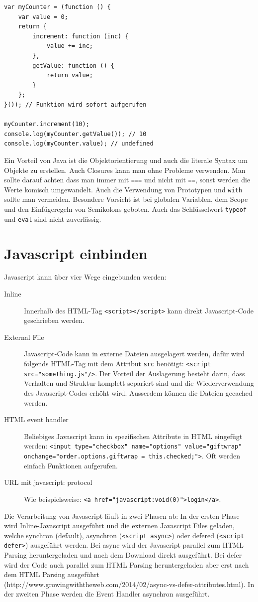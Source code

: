 \begin{lstlisting}[label=lst:scope,caption=Scope]
var myCounter = (function () {
	var value = 0;
	return {
		increment: function (inc) {
			value += inc;
		},
		getValue: function () {
			return value;
		}
	};
}()); // Funktion wird sofort aufgerufen

myCounter.increment(10);
console.log(myCounter.getValue()); // 10
console.log(myCounter.value); // undefined
\end{lstlisting}

Ein Vorteil von Java ist die Objektorientierung und auch die literale Syntax um Objekte zu erstellen. Auch Closures kann man ohne Probleme verwenden. Man sollte darauf achten dass man immer mit \lstinline|===| und nicht mit \lstinline|==|, sonst werden die Werte komisch umgewandelt. Auch die Verwendung von Prototypen und \lstinline|with| sollte man vermeiden. Besondere Vorsicht ist bei globalen Variablen, dem Scope und den Einfügeregeln von Semikolons geboten. Auch das Schlüsselwort \lstinline|typeof| und \lstinline|eval| sind nicht zuverlässig.

\section{Javascript einbinden}
Javascript kann über vier Wege eingebunden werden:
\begin{description}
	\item[Inline] Innerhalb des HTML-Tag \lstinline|<script></script>| kann direkt Javascript-Code geschrieben werden.
	\item[External File] Javascript-Code kann in externe Dateien ausgelagert werden, dafür wird folgends HTML-Tag mit dem Attribut \lstinline|src| benötigt: \lstinline|<script src="something.js"/>|. Der Vorteil der Auslagerung besteht darin, dass Verhalten und Struktur komplett separiert sind und die Wiederverwendung des Javascript-Codes erhöht wird. Ausserdem können die Dateien gecached werden.
	\item[HTML event handler] Beliebiges Javascript kann in spezifischen Attribute in HTML eingefügt werden: \lstinline|<input type="checkbox" name="options" value="giftwrap" onchange="order.options.giftwrap = this.checked;">|. Oft werden einfach Funktionen aufgerufen.
	\item[URL mit javascript: protocol] Wie beispielsweise: \lstinline|<a href="javascript:void(0)">login</a>|.
\end{description}

Die Verarbeitung von Javascript läuft in zwei Phasen ab: In der ersten Phase wird Inline-Javascript ausgeführt und die externen Javascript Files geladen, welche synchron (default), asynchron (\lstinline|<script async>|) oder defered (\lstinline|<script defer>|) ausgeführt werden. Bei async wird der Javascript parallel zum HTML Parsing heruntergeladen und nach dem Download direkt ausgeführt. Bei defer wird der Code auch parallel zum HTML Parsing heruntergeladen aber erst nach dem HTML Parsing ausgeführt (http://www.growingwiththeweb.com/2014/02/async-vs-defer-attributes.html). In der zweiten Phase werden die Event Handler asynchron ausgeführt. 


